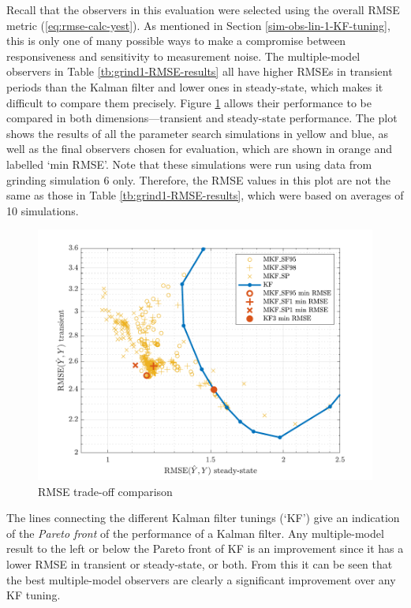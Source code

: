 Recall that the observers in this evaluation were selected using the overall \gls{RMSE} metric (\ref{eq:rmse-calc-yest}). As mentioned in Section \ref{sim-obs-lin-1-KF-tuning}, this is only one of many possible ways to make a compromise between responsiveness and sensitivity to measurement noise. The multiple-model observers in Table \ref{tb:grind1-RMSE-results} all have higher \gls{RMSE}s in transient periods than the Kalman filter and lower ones in steady-state, which makes it difficult to compare them precisely. Figure \ref{fig:grind1-RMSE-scatter} allows their performance to be compared in both dimensions---transient and steady-state performance. The plot shows the results of all the parameter search simulations in yellow and blue, as well as the final observers chosen for evaluation, which are shown in orange and labelled `min RMSE'. Note that these simulations were run using data from grinding simulation 6 only. Therefore, the \gls{RMSE} values in this plot are not the same as those in Table \ref{tb:grind1-RMSE-results}, which were based on averages of 10 simulations.
\begin{figure}[htp]
	\centering
	\includegraphics[width=13cm]{images/grind1_rod_obs_sim_popt_RMSE_scatter.pdf}
	\caption{RMSE trade-off comparison}
	\label{fig:grind1-RMSE-scatter}
\end{figure}
The lines connecting the different Kalman filter tunings (`KF') give an indication of the \textit{Pareto front} of the performance of a Kalman filter. Any multiple-model result to the left or below the Pareto front of KF is an improvement since it has a lower \gls{RMSE} in transient or steady-state, or both. From this it can be seen that the best multiple-model observers are clearly a significant improvement over any KF tuning.

